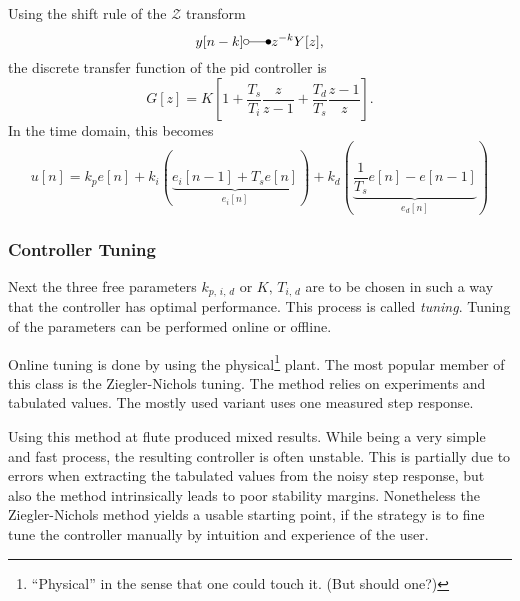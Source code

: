 Using the shift rule of the $\mathcal{Z}$ transform\cite{Leon2015}
\begin{equation}
y[n-k] \laplace z^{-k} Y[z],
\end{equation}
the discrete transfer function of the \gls{pid} controller is
\begin{equation}
G[z]=K\left[1+\frac{T_s}{T_i}\frac{z}{z-1}+\frac{T_d}{T_s}\frac{z-1}{z}\right].
\end{equation}
In the time domain, this becomes
\begin{equation}\label{eq:pidn}
u[n] = k_p e[n] 
+ k_i \left(\underbrace{e_i[n-1] + T_s e[n]}_{e_i[n]}\right) 
+ k_d \left(\underbrace{\frac{1}{T_s} e[n]-e[n-1]}_{e_d[n]}\right)
\end{equation}

\subsubsection{Controller Tuning}
Next the three free parameters $k_{p,\,i,\,d}$ or $K,\,T_{i,\,d}$ are to be chosen in such a way that the controller has optimal performance. This process is called \textit{tuning}. Tuning of the parameters can be performed online or offline.

Online tuning is done by using the physical\footnote{``Physical'' in the sense that one could touch it. (But should one?)} plant. The most popular member of this class is the Ziegler-Nichols tuning\cite{Ziegler1942}. The method relies on experiments and tabulated values. The mostly used variant uses one measured step response.

Using this method at \gls{flute} produced mixed results. While being a very simple and fast process, the resulting controller is often unstable. This is partially due to errors when extracting the tabulated values from the noisy step response, but also the method intrinsically leads to poor stability margins.\cite[p.~142]{Aastroem1995}
Nonetheless the Ziegler-Nichols method yields a usable starting point, if the strategy is to fine tune the controller manually by intuition and experience of the user.

